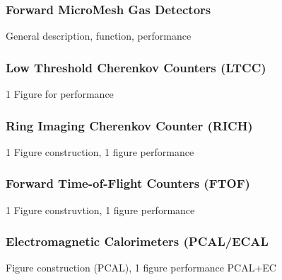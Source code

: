 \subsubsection{Forward MicroMesh Gas Detectors}
General description, function, performance

\subsubsection{Low Threshold Cherenkov Counters (LTCC)}
\label{ltcc}
1 Figure for performance
\vspace{0.3cm}\noindent
\subsubsection{Ring Imaging Cherenkov Counter (RICH)}
\label{rich}
1 Figure construction, 1 figure performance
\vspace{0.3cm}\noindent
\subsubsection{Forward Time-of-Flight Counters (FTOF)}
\label{ftof}
1 Figure construvtion, 1 figure performance
\vspace{0.3cm}\noindent
\subsubsection{Electromagnetic Calorimeters (PCAL/ECAL }
\vspace{0.3cm} Figure construction (PCAL), 1 figure performance PCAL+EC
